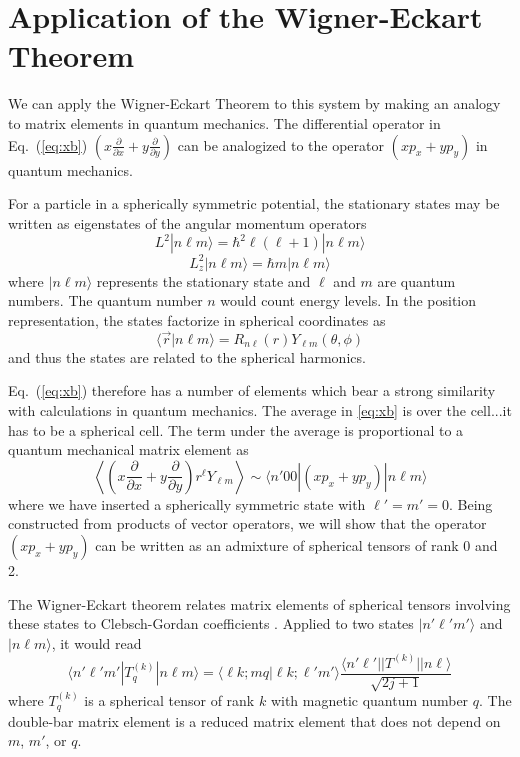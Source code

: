 \documentclass[preprint,12pt]{elsarticle}
\begin{document}
\section{Application of the Wigner-Eckart Theorem}

We can apply the Wigner-Eckart Theorem to this system by making an
analogy to matrix elements in quantum mechanics.  The differential
operator in Eq.~(\ref{eq:xb}) $\left(x\frac{\partial}{\partial
  x}+y\frac{\partial}{\partial y}\right)$ can be analogized to the
operator $(xp_x+yp_y)$ in quantum mechanics.

For a particle in a spherically symmetric potential, the stationary
states may be written as eigenstates of the angular momentum operators
\begin{equation}
L^2|n\ell m\rangle=\hbar^2\ell(\ell+1)|n\ell m\rangle
\end{equation}
\begin{equation}
L_z^2|n\ell m\rangle=\hbar m|n\ell m\rangle
\end{equation}
where $|n\ell m\rangle$ represents the stationary state and $\ell$ and
$m$ are quantum numbers.  The quantum number $n$ would count energy
levels.  In the position representation, the states factorize in
spherical coordinates as
\begin{equation}
\langle\vec{r}|n\ell m\rangle=R_{n\ell}(r)Y_{\ell m}(\theta,\phi)
\end{equation}
and thus the states are related to the spherical harmonics.

Eq.~(\ref{eq:xb}) therefore has a number of elements which bear a
strong similarity with calculations in quantum mechanics.  The average
in \ref{eq:xb} is over the cell...it has to be a spherical cell.  The
term under the average is proportional to a quantum mechanical matrix
element as
\begin{equation}
\label{eq:matrix}
  \left\langle\left(x\frac{\partial}{\partial
  x}+y\frac{\partial}{\partial y}\right)r^\ell Y_{\ell
  m}\right\rangle\sim\langle n'00|(xp_x+yp_y)|n\ell m\rangle
\end{equation}
where we have inserted a spherically symmetric state with
$\ell'=m'=0$.  Being constructed from products of vector operators, we
will show that the operator $(xp_x+yp_y)$ can be written as an
admixture of spherical tensors of rank 0 and 2.

The Wigner-Eckart theorem relates matrix elements of spherical tensors
involving these states to Clebsch-Gordan coefficients
\cite{bib:sakurai}.  Applied to two states $|n'\ell'm'\rangle$ and
$|n\ell m\rangle$, it would read
\begin{equation}
\langle n'\ell'm'|T_q^{(k)}|n\ell m\rangle=\langle\ell k;mq|\ell k;\ell'm'\rangle\frac{\langle n'\ell'||T^{(k)}||n\ell\rangle}{\sqrt{2j+1}}
\end{equation}
where $T_q^{(k)}$ is a spherical tensor of rank $k$ with magnetic
quantum number $q$.  The double-bar matrix element is a reduced matrix
element that does not depend on $m$, $m'$, or $q$.
\end{document}
